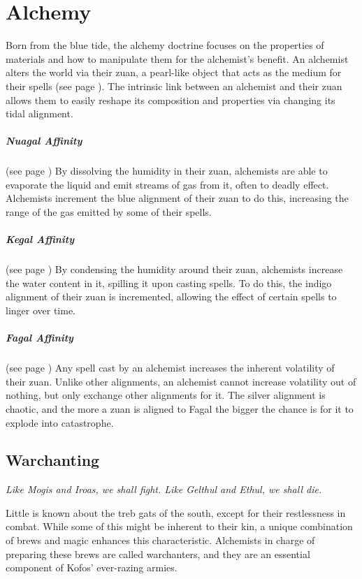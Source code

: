 \section{Alchemy} \label{sec::alchemy}
Born from the blue tide, the alchemy doctrine focuses on the properties of materials and how to manipulate them for the alchemist's benefit.
An alchemist alters the world via their zuan, a pearl-like object that acts as the medium for their spells (see page \pageref{item::zuan}).
The intrinsic link between an alchemist and their zuan allows them to easily reshape its composition and properties via changing its tidal alignment.


\subparagraph{Nuagal Affinity}
    (see page \pageref{medium::dissolve})
    By dissolving the humidity in their zuan, alchemists are able to evaporate the liquid and emit streams of gas from it, often to deadly effect.
    Alchemists increment the blue alignment of their zuan to do this, increasing the range of the gas emitted by some of their spells.

\subparagraph{Kegal Affinity}
    (see page \pageref{medium::condense})
    By condensing the humidity around their zuan, alchemists increase the water content in it, spilling it upon casting spells.
    To do this, the indigo alignment of their zuan is incremented, allowing the effect of certain spells to linger over time.

\subparagraph{Fagal Affinity}
    (see page \pageref{medium::volatilize})
    Any spell cast by an alchemist increases the inherent volatility of their zuan.
    Unlike other alignments, an alchemist cannot increase volatility out of nothing, but only exchange other alignments for it.
    The silver alignment is chaotic, and the more a zuan is aligned to Fagal the bigger the chance is for it to explode into catastrophe.

\subsection*{Warchanting} \label{ssec::warchanting}
    \textit{Like Mogis and Iroas, we shall fight.
    Like Gelthul and Ethul, we shall die.}

    Little is known about the treb gats of the south, except for their restlessness in combat.
    While some of this might be inherent to their kin, a unique combination of brews and magic enhances this characteristic.
    Alchemists in charge of preparing these brews are called warchanters, and they are an essential component of Kofos' ever-razing armies.


